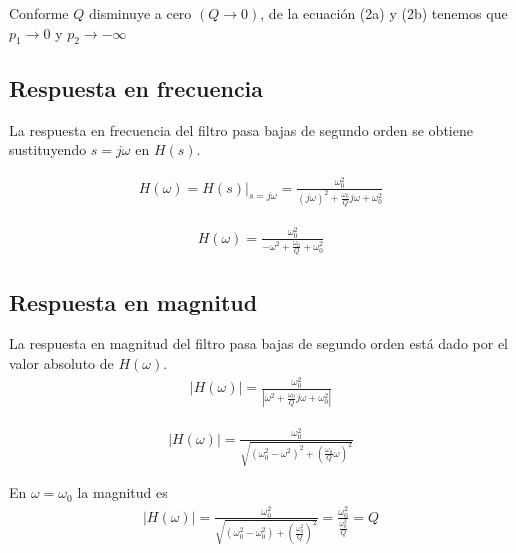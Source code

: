 \documentclass[12pt,a4paper]{article}
\begin{document}
	Conforme $Q$ disminuye a cero $(Q\rightarrow 0)$, de la ecuación (2a) y (2b) tenemos que $p_1 \rightarrow 0$ y $p_2 \rightarrow - \infty$
	
	\subsection{Respuesta en frecuencia}
	La respuesta en frecuencia del filtro pasa bajas de segundo orden se obtiene sustituyendo $s=j\omega$ en $H(s)$.
	
	\begin{align}
		H(\omega) = H(s)|_{s=j\omega} = \frac{\omega_0^{2}}{(j\omega)^{2} + \frac{\omega_0}{Q}j\omega + \omega_0^{2}}\nonumber
	\end{align}
	\begin{tcolorbox}[colback=red!5!white,colframe=red!75!black,width=(\linewidth+0.45cm)]
		\begin{align}
			H(\omega) = \frac{\omega_0^{2}}{-\omega^{2} + \frac{\omega_0}{Q} + \omega_0^{2}}
		\end{align}	
	\end{tcolorbox}

	\subsection{Respuesta en magnitud}
	La respuesta en magnitud del filtro pasa bajas de segundo orden está dado por el valor absoluto de $H(\omega)$.
	\begin{align}
		\left| H(\omega) \right| = \frac{\omega_0^{2}}{\left|\omega^{2}  + \frac{\omega_0}{Q}j\omega + \omega_0^{2} \right|}\nonumber
	\end{align}
	\begin{tcolorbox}[colback=red!5!white,colframe=red!75!black,width=(\linewidth+0.45cm)]
		\begin{align}
			|H(\omega)| = \frac{\omega_0^{2}}{\sqrt{(\omega_0^{2} - \omega^{2})^{2} + (\frac{\omega_0}{Q}\omega)^{2} }}
		\end{align}	
	\end{tcolorbox}
	
	En $\omega = \omega_0$ la magnitud es
	\begin{align}
		|H(\omega)| = \frac{ \omega_0^{2} }{ \sqrt{ (\omega_0^{2} - \omega_0^{2} ) + \left(  \frac{\omega_0^{2}}{Q}\right)^{2} } } = \frac{\omega_0^{2}}{\frac{\omega_0^{2}}{Q}} = Q\nonumber 
	\end{align}
\end{document}
